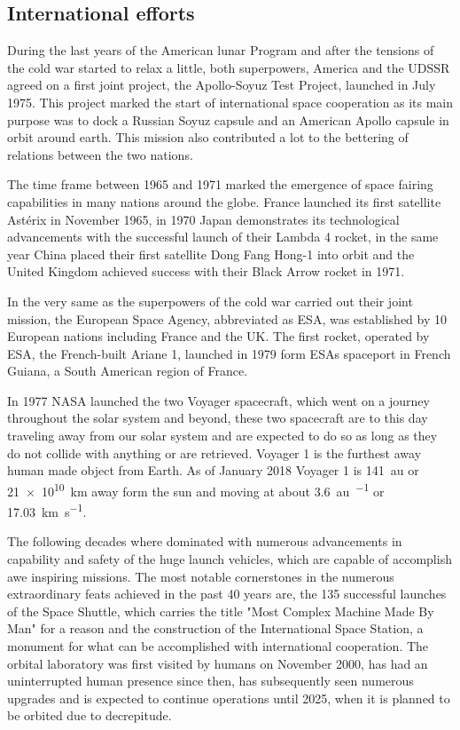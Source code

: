 \subsection{International efforts}

During the last years of the American lunar Program and after the tensions of the cold war started to relax a little, both superpowers, America and the UDSSR agreed on a first joint project, the Apollo-Soyuz Test Project, launched in July 1975. This project marked the start of international space cooperation as its main purpose was to dock a Russian Soyuz capsule and an American Apollo capsule in orbit around earth. This mission also contributed a lot to the bettering of relations between the two nations.

The time frame between 1965 and 1971 marked the emergence of space fairing capabilities in many nations around the globe. France launched its first satellite Astérix in November 1965, in 1970 Japan demonstrates its technological advancements with the successful launch of their Lambda 4 rocket, in the same year China placed their first satellite Dong Fang Hong-1 into orbit and the United Kingdom achieved success with their Black Arrow rocket in 1971.

In the very same as the superpowers of the cold war carried out their joint mission, the European Space Agency, abbreviated as ESA, was established by 10 European nations including France and the UK. The first rocket, operated by ESA, the French-built Ariane 1, launched in 1979 form ESAs spaceport in French Guiana, a South American region of France.

In 1977 NASA launched the two Voyager spacecraft, which went on a journey throughout the solar system and beyond, these two spacecraft are to this day traveling away from our solar system and are expected to do so as long as they do not collide with anything or are retrieved. Voyager 1 is the furthest away human made object from Earth. As of January 2018 Voyager 1 is \SI{141}{\astronomicalunit} or \SI{21e10}{\kilo\meter} away form the sun and moving at about \SI{3.6}{\astronomicalunit\per\year} or \SI{17.03}{\kilo\meter\per\second}.

The following decades where dominated with numerous advancements in capability and safety of the huge launch vehicles, which are capable of accomplish awe inspiring missions. The most notable cornerstones in the numerous extraordinary feats achieved in the past 40 years are, the 135 successful launches of the Space Shuttle, which carries the title "Most Complex Machine Made By Man" for a reason and the construction of the International Space Station, a monument for what can be accomplished with international cooperation. The orbital laboratory was first visited by humans on November 2000, has had an uninterrupted human presence since then, has subsequently seen numerous upgrades and is expected to continue operations until 2025, when it is planned to be orbited due to decrepitude.

